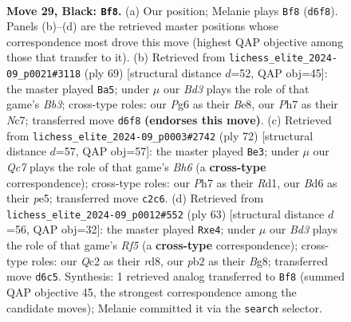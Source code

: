 \documentclass[11pt]{article}
\begin{document}
\clearpage

\begin{figure}[p]\centering
\begin{subfigure}{0.46\textwidth}\centering
\resizebox{\linewidth}{!}{%
\newchessgame
\chessboard[
  setfen={8/pp5p/3bR1pk/8/8/P5P1/BPq2P1P/6K1 b - - 4 29},
  showmover=false,
  pgfstyle=straightmove, color=movearrow, markmove={d6-f8}
]}
\caption{}
\end{subfigure}\hfill
\begin{subfigure}{0.46\textwidth}\centering
\resizebox{\linewidth}{!}{%
\newchessgame
\chessboard[
  setfen={1R2b1k1/2n3pp/1bP2p2/8/8/3P2P1/4PP1P/6K1 b - - 7 35},
  showmover=false,
  pgfstyle=straightmove, color=movearrow, markmove={b6-a5}
]}
\caption{}
\end{subfigure}
\\[4pt]
\begin{subfigure}{0.46\textwidth}\centering
\resizebox{\linewidth}{!}{%
\newchessgame
\chessboard[
  setfen={4qb1k/1r4p1/p4p1B/4pQ1P/8/8/5PP1/3R2K1 w - - 0 37},
  showmover=false,
  pgfstyle=straightmove, color=movearrow, markmove={h6-e3}
]}
\caption{}
\end{subfigure}\hfill
\begin{subfigure}{0.46\textwidth}\centering
\resizebox{\linewidth}{!}{%
\newchessgame
\chessboard[
  setfen={3R2bk/1Bp3pp/6q1/pP6/2P1Pr2/P5P1/1B4K1/8 b - - 3 32},
  showmover=false,
  pgfstyle=straightmove, color=movearrow, markmove={f4-e4}
]}
\caption{}
\end{subfigure}
\caption{\textbf{Move 29, Black: \texttt{Bf8}.} (a) Our position; Melanie plays \texttt{Bf8} (\texttt{d6f8}). Panels (b)--(d) are the retrieved master positions whose correspondence most drove this move (highest QAP objective among those that transfer to it). (b) Retrieved from \texttt{lichess\_elite\_2024-09\_p0021\#3118} (ply 69) [structural distance $d$=52, QAP obj=45]: the master played \texttt{Ba5}; under $\mu$ our \emph{Bd3} plays the role of that game's \emph{Bb3}; cross-type roles: our \emph{P}g6 as their \emph{B}e8, our \emph{P}h7 as their \emph{N}c7; transferred move \texttt{d6f8} \textbf{(endorses this move)}. (c) Retrieved from \texttt{lichess\_elite\_2024-09\_p0003\#2742} (ply 72) [structural distance $d$=57, QAP obj=57]: the master played \texttt{Be3}; under $\mu$ our \emph{Qc7} plays the role of that game's \emph{Bh6} (a \textbf{cross-type} correspondence); cross-type roles: our \emph{P}h7 as their \emph{R}d1, our \emph{B}d6 as their \emph{p}e5; transferred move \texttt{c2c6}. (d) Retrieved from \texttt{lichess\_elite\_2024-09\_p0012\#552} (ply 63) [structural distance $d$=56, QAP obj=32]: the master played \texttt{Rxe4}; under $\mu$ our \emph{Bd3} plays the role of that game's \emph{Rf5} (a \textbf{cross-type} correspondence); cross-type roles: our \emph{Q}c2 as their \emph{r}d8, our \emph{p}b2 as their \emph{B}g8; transferred move \texttt{d6c5}. Synthesis: 1 retrieved analog transferred to \texttt{Bf8} (summed QAP objective 45, the strongest correspondence among the candidate moves); Melanie committed it via the \texttt{search} selector.}
\label{fig:thought-m57}
\end{figure}
\end{document}
